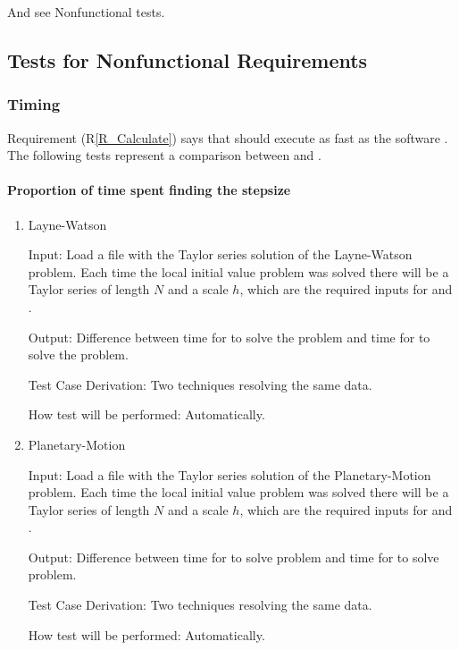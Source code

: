 \documentclass[12pt, titlepage]{article}
\newcommand{\rref}[1]{(R\ref{#1})}
\begin{document}
And see Nonfunctional tests.

\subsection{Tests for Nonfunctional Requirements}

\subsubsection{Timing}

Requirement \rref{R_Calculate} says that  should execute as fast as
the \cite{chang1982} software \rdcon. The following tests represent a comparison between
 and \rdcon.

\paragraph{Proportion of time spent finding the stepsize}

\begin{enumerate}

  \item{Layne-Watson \citep{watson1979}\\}

					
					
Input: Load a file with the Taylor series solution of the Layne-Watson problem. Each time the
    local initial value problem was solved there will be a Taylor series of length $N$ and a scale $h$,
    which are the required inputs for  and \rdcon.
					
Output: Difference between time for  to solve the problem and time for \rdcon to
    solve the problem.

Test Case Derivation: Two techniques resolving the same data.
					
How test will be performed: Automatically.
					
\item{Planetary-Motion \citep{enright1987examples}\\}

					
					
Input: Load a file with the Taylor series solution of the Planetary-Motion problem. Each time the
    local initial value problem was solved there will be a Taylor series of length $N$ and a scale $h$,
    which are the required inputs for  and \rdcon.
					
Output: Difference between time for  to solve problem and time for \rdcon to solve problem.

Test Case Derivation: Two techniques resolving the same data.
					
How test will be performed: Automatically.

\end{enumerate}
\end{document}
